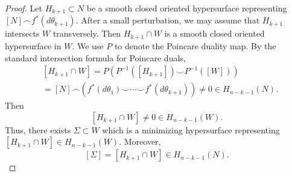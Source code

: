 \documentclass[10pt,a4paper]{amsart}
\begin{document}
\begin{proof}
    Let $H_{k+1}\subset N$ be a smooth closed oriented hypersurface representing
      $[N]\frown f^{*}(d\theta_{k+1})$. After a small perturbation, we may assume that
      $H_{k+1}$ intersects $W$ transversely. Then $H_{k+1}\cap W$ is a smooth closed oriented
      hypersurface in $W$. We use $P$ to denote the Poincare duality map. By the standard
      intersection formula for Poincare duals,
    \[
    \begin{aligned}
    &[H_{k+1}\cap W] = P(P^{-1}([H_{k+1}])\smile P^{-1}([W]))\\
    &= [N]\frown(f^{*}(d\theta_{1})\smile \cdots\smile f^{*}(d\theta_{k+1}))\neq 0\in H_{n-k-1}(N).
    \end{aligned}
    \]
    Then
    \[
    [H_{k+1}\cap W]\neq 0 \in H_{n-k-1}(W).
    \]
    Thus, there exists $\Sigma\subset W$ which is a minimizing hypersurface representing $[H_{k+1}\cap W]\in H_{n-k-1}(W)$. Moreover,
    \[
    [\Sigma]= [H_{k+1}\cap W]\in H_{n-k-1}(N).
    \]
\end{proof}
\end{document}

